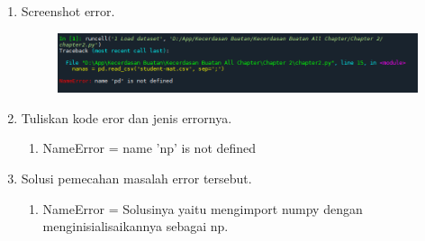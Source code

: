 \begin{enumerate}
	\item Screenshot error.
	\begin{figure}[!htbp]
		\centering
		\includegraphics[scale=0.5]{figures/chapter2/13.PNG}
	\end{figure}
	
	\item Tuliskan kode eror dan jenis errornya.
	\begin{enumerate}
		\item NameError = name 'np' is not defined
	\end{enumerate}
	
	\item Solusi pemecahan masalah error tersebut.
	\begin{enumerate}
		\item NameError = Solusinya yaitu mengimport numpy dengan menginisialisaikannya sebagai np.
	\end{enumerate}
	
\end{enumerate}

